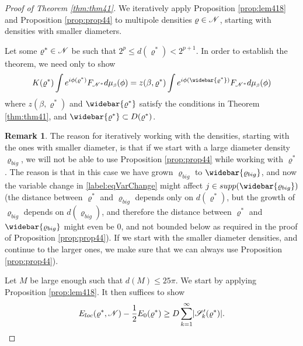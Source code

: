 \documentclass[11pt,reqno]{article}
\DeclarePairedDelimiter\abs{\lvert}{\rvert}%
\theoremstyle{definition}
\newtheorem*{remark}{Remark}
\numberwithin{equation}{section}
\begin{document}
\begin{proof}[Proof of Theorem \eqref{thm:thm41}]
We iteratively apply Proposition \eqref{prop:lem418} and Proposition \eqref{prop:prop44} to  multipole densities $\varrho \in \mathscr{N}$, starting with densities with smaller diameters. 

Let some $\varrho^* \in \mathscr{N}$ be such that $2^p \leq d(\varrho^*) < 2^{p+1}$. In order to establish the theorem, we need only to show
$$
K(\varrho^*)\int e^{i\phi(\varrho^*)}F_{\ens^*}\mida = z(\beta, \varrho^*) \int e^{i\phi(\widebar{\varrho^*})}F_{\ens^*}\mida
$$
where $z(\beta, \varrho^*)$ and $\widebar{\varrho^*}$ satisfy the conditions in Theorem \eqref{thm:thm41}, and $\widebar{\varrho^*} \subset D(\varrho^*)$.

\begin{remark}
The reason for iteratively working with the densities, starting with the ones with smaller diameter, is that if we start with a large diameter density $\varrho_{big}$, we will not be able to use Proposition \eqref{prop:prop44} while working with $\varrho^*$. The reason is that in this case we have grown $\varrho_{big}$ to $\widebar{\varrho_{big}}$, and now the variable change in \eqref{label:eqVarChange} might affect $j \in supp(\widebar{\varrho_{big}})$ (the distance between $\varrho^*$ and $\varrho_{big}$ depends only on $d(\varrho^*)$, but the growth of $\varrho_{big}$ depends on $d(\varrho_{big})$, and therefore the distance between $\varrho^*$ and $\widebar{\varrho_{big}}$ might even be 0, and not bounded below as required in the proof of Proposition \eqref{prop:prop44}). If we start with the smaller diameter densities, and continue to the larger ones, we make sure that we can always use Proposition \eqref{prop:prop44}).
\end{remark}

\newcommand*{\SqrsSetOf}[2]{\mathscr{S}_{#1}(#2)}
\newcommand*{\SqrsSetTagOf}[2]{\mathscr{S}^\prime_{#1}(#2)}

Let $M$ be large enough such that $d(M) \leq 25\pi$. 
We start by applying Proposition \eqref{prop:lem418}. It then suffices to show
\begin{equation} \label{label:eq458}
E_{loc}(\varrho^*, \ens) - \frac{1}{2}E_0(\varrho^*) \geq D\sum_{k=1}^\infty \abs{\SqrsSetTagOf{k}{\varrho^*}}.
\end{equation}


\end{proof}
\end{document}
